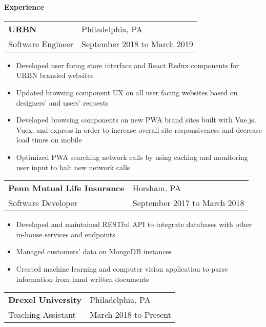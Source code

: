 \documentclass[10pt,]{article}
\let\oldparagraph\paragraph
\renewcommand{\paragraph}[1]{\oldparagraph{#1}\mbox{}}
\begin{document}
\hypertarget{experience}{%
\paragraph{Experience}\label{experience}}

\begin{tabularx}{\textwidth}{l X}
    \textbf{URBN} & \hfill Philadelphia, PA\\
    Software Engineer        & \hfill September 2018 to March 2019
\end{tabularx}

\begin{itemize}
	\setlength\itemsep{-0.75em}
    \item Developed user facing store interface and React Redux components for URBN branded websites
    \item Updated browsing component UX on all user facing websites based on designers' and users' requests
    \item Developed browsing components on new PWA brand sites built with Vue.js, Vuex, and express in order to increase overall site responsiveness and decrease load times on mobile
    \item Optimized PWA searching network calls by using caching and monitoring user input to halt new network calls
\end{itemize}

\begin{tabularx}{\textwidth}{l X}
    \textbf{Penn Mutual Life Insurance} & \hfill Horsham, PA\\
    Software Developer          & \hfill September 2017 to March 2018
\end{tabularx}

\begin{itemize}
	\setlength\itemsep{-0.75em}
    \item Developed and maintained RESTful API to integrate databases with other in-house services and endpoints
    \item Managed customers' data on MongoDB instances
    \item Created machine learning and computer vision application to parse information from hand written documents
\end{itemize}

\begin{tabularx}{\textwidth}{l X}
	\textbf{Drexel University} & \hfill Philadelphia, PA\\
	Teaching Assistant          & \hfill March 2018 to Present
\end{tabularx}
\end{document}
